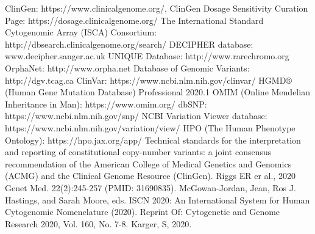 \documentclass{article}
\begin{document}
\begin{thebibliography}{9}
		ClinGen: https://www.clinicalgenome.org/, ClinGen Dosage Sensitivity Curation Page: https://dosage.clinicalgenome.org/
		The International Standard Cytogenomic Array (ISCA) Consortium: http://dbsearch.clinicalgenome.org/search/
		DECIPHER database: www.decipher.sanger.ac.uk
		UNIQUE Database: http://www.rarechromo.org
		OrphaNet: http://www.orpha.net
		Database of Genomic Variants: http://dgv.tcag.ca
		ClinVar: https://www.ncbi.nlm.nih.gov/clinvar/
		HGMD® (Human Gene Mutation Database) Professional 2020.1
		OMIM (Online Mendelian Inheritance in Man): https://www.omim.org/
		dbSNP: https://www.ncbi.nlm.nih.gov/snp/
		NCBI Variation Viewer database: https://www.ncbi.nlm.nih.gov/variation/view/
		HPO (The Human Phenotype Ontology): https://hpo.jax.org/app/
		Technical standards for the interpretation and reporting of constitutional copy-number variants: a joint consensus recommendation of the American College of Medical Genetics and Genomics (ACMG) and the Clinical Genome Resource (ClinGen). Riggs ER er al., 2020 Genet Med. 22(2):245-257 (PMID: 31690835).
		McGowan-Jordan, Jean, Ros J. Hastings, and Sarah Moore, eds. ISCN 2020: An International System for Human Cytogenomic Nomenclature (2020). Reprint Of: Cytogenetic and Genome Research 2020, Vol. 160, No. 7-8. Karger, S, 2020.
\end{thebibliography}
\end{document}
